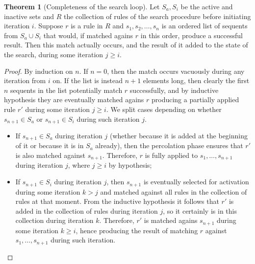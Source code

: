 \documentclass{article}
\theoremstyle{definition}
\newtheorem{theorem}{Theorem}
\begin{document}
\begin{theorem}[Completeness of the search loop]
  Let $S_a, S_i$ be the active and inactive sets and $R$ the collection of rules
  of the search procedure before initiating iteration $i$. Suppose $r$ is a rule
  in $R$ and $s_1, s_2, \dots, s_n$ is an ordered list of sequents from
  $S_a \cup S_i$ that would, if matched agains $r$ in this order, produce a
  successful result. Then this match actually occurs, and the result of it added
  to the state of the search, during some iteration $j \geq i$.
\end{theorem}
\begin{proof}
  By induction on $n$. If $n = 0$, then the match occurs vacuously during any
  iteration from $i$ on. If the list is instead $n+1$ elements long, then
  clearly the first $n$ sequents in the list potentially match $r$ successfully,
  and by inductive hypothesis they are eventually matched agains $r$ producing a
  partially applied rule $r'$ during some iteration $j \geq i$. We split cases
  depending on whether $s_{n+1} \in S_a$ or $s_{n+1} \in S_i$ during such
  iteration $j$.

  \begin{itemize}
  \item If $s_{n+1} \in S_a$ during iteration $j$ (whether because it is added
    at the beginning of it or because it is in $S_a$ already), then the
    percolation phase ensures that $r'$ is also matched against
    $s_{n+1}$. Therefore, $r$ is fully applied to $s_1, \dots, s_{n+1}$ during
    iteration $j$, where $j \geq i$ by hypothesis;
    
  \item If $s_{n+1} \in S_i$ during iteration $j$, then $s_{n+1}$ is eventually
    selected for activation during some iteration $k > j$ and matched against
    all rules in the collection of rules at that moment. From the inductive
    hypothesis it follows that $r'$ is added in the collection of rules during
    iteration $j$, so it certainly is in this collection during iteration
    $k$. Therefore, $r'$ is matched agains $s_{n+1}$ during some iteration
    $k \geq i$, hence producing the result of matching $r$ against
    $s_1, \dots, s_{n+1}$ during such iteration.
  \end{itemize}
\end{proof}


\end{document}
